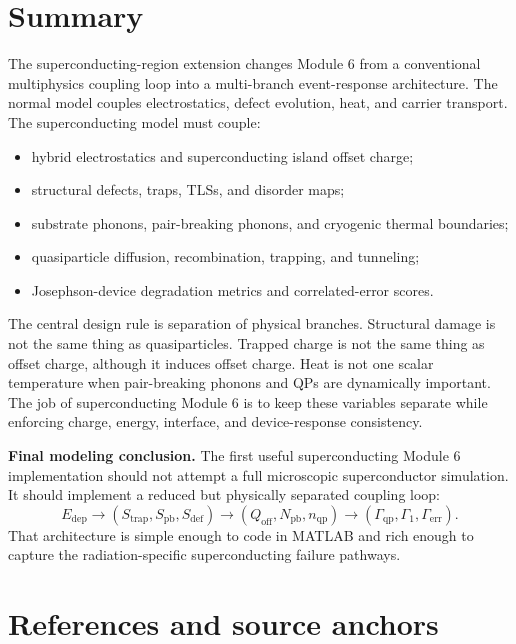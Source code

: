 \documentclass[11pt]{article}
\newcommand{\Edep}{E_{\mathrm{dep}}}
\newcommand{\Qoff}{Q_{\mathrm{off}}}
\newcommand{\Npb}{N_{\mathrm{pb}}}
\newcommand{\nqp}{n_{\mathrm{qp}}}
\newcommand{\Gammaqp}{\Gamma_{\mathrm{qp}}}
\newcommand{\Gammaone}{\Gamma_1}
\newcommand{\Gammaerr}{\Gamma_{\mathrm{err}}}
\begin{document}
\section{Summary}

The superconducting-region extension changes Module 6 from a conventional multiphysics coupling loop into a multi-branch event-response architecture. The normal model couples electrostatics, defect evolution, heat, and carrier transport. The superconducting model must couple:
\begin{itemize}[leftmargin=2em]
\item hybrid electrostatics and superconducting island offset charge;
\item structural defects, traps, TLSs, and disorder maps;
\item substrate phonons, pair-breaking phonons, and cryogenic thermal boundaries;
\item quasiparticle diffusion, recombination, trapping, and tunneling;
\item Josephson-device degradation metrics and correlated-error scores.
\end{itemize}

The central design rule is separation of physical branches. Structural damage is not the same thing as quasiparticles. Trapped charge is not the same thing as offset charge, although it induces offset charge. Heat is not one scalar temperature when pair-breaking phonons and QPs are dynamically important. The job of superconducting Module 6 is to keep these variables separate while enforcing charge, energy, interface, and device-response consistency.

\begin{physicsbox}
\textbf{Final modeling conclusion.} The first useful superconducting Module 6 implementation should not attempt a full microscopic superconductor simulation. It should implement a reduced but physically separated coupling loop:
\begin{equation}
\Edep\rightarrow
(S_{\mathrm{trap}},S_{\mathrm{pb}},S_{\mathrm{def}})
\rightarrow
(\Qoff,\Npb,\nqp)
\rightarrow
(\Gammaqp,\Gammaone,\Gammaerr).
\end{equation}
That architecture is simple enough to code in MATLAB and rich enough to capture the radiation-specific superconducting failure pathways.
\end{physicsbox}

\section*{References and source anchors}
\end{document}
